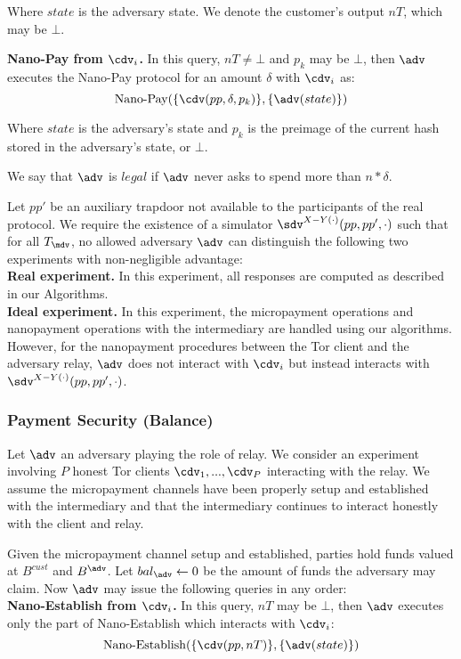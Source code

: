 Where $state$ is the adversary state. We denote the customer's output $nT$, which may be $\bot$.


\textbf{Nano-Pay from $\cdv_i$.} In this query, $nT \neq \bot$ and $p_k$ may be $\bot$, then $\adv$ executes the Nano-Pay protocol for an amount $\delta$ with $\cdv_i$ as:
$$\operatorname{Nano-Pay}(\{\cdv(pp, \delta, p_k)\}, \{\adv(state)\})$$

Where $state$ is the adversary's state and $p_k$ is the preimage of the current hash stored in the adversary's state, or $\bot$.

We say that $\adv$ is $legal$ if $\adv$ never asks to spend more than $n*\delta$.

Let $pp'$ be an auxiliary trapdoor not available to the participants of the real protocol. We require the existence of a simulator $\sdv^{X-Y(\cdot)}(pp, pp', \cdot)$ such that for all $T_\mdv$, no allowed adversary $\adv$ can distinguish the following two experiments with non-negligible advantage:\\
\textbf{Real experiment.} In this experiment, all responses are computed as described in our Algorithms.\\
\textbf{Ideal experiment.} In this experiment, the micropayment operations and nanopayment operations with the intermediary are handled using our algorithms. However, for the nanopayment procedures between the Tor client and the adversary relay, $\adv$ does not interact with $\cdv_i$ but instead interacts with $\sdv^{X-Y(\cdot)}(pp,pp',\cdot)$.

\subsubsection{Payment Security (Balance)}
\label{def:balance}

Let $\adv$ an adversary playing the role of relay. We consider an experiment
involving $P$ honest Tor clients $\cdv_1,..., \cdv_P$ interacting with the
relay. We assume the micropayment channels have been properly setup and
established with the intermediary and that the intermediary continues to
interact honestly with the client and relay.

Given the micropayment channel setup and established, parties hold funds valued
at $B^{cust}$ and $B^{\adv}$. Let $bal_\adv \leftarrow 0$ be the amount of funds
the adversary may claim. Now $\adv$ may issue the following queries in any order:\\

\textbf{Nano-Establish from $\cdv_i$.} In this query, $nT$ may be $\bot$, then $\adv$ executes only the part of Nano-Establish which interacts with $\cdv_i$:
$$\operatorname{Nano-Establish}(\{\cdv(pp, nT)\}, \{\adv(state)\})$$

